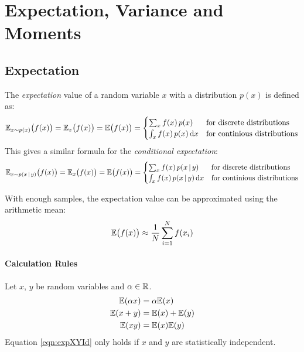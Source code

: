 	\section{Expectation, Variance and Moments}
		\subsection{Expectation}
			The \emph{expectation} value of a random variable \(x\) with a distribution \(p(x)\) is defined as:
			\begin{equation}
				\mathbb{E}_{x \sim p(x)}\big(f(x)\big) = \mathbb{E}_x\big(f(x)\big) = \mathbb{E}\big(f(x)\big) =
				\begin{cases}
					\sum_x f(x) \, p(x)        & \textrm{for discrete distributions}   \\
					\int_x f(x) \, p(x) \dd{x} & \textrm{for continious distributions}
				\end{cases}
			\end{equation}
			This gives a similar formula for the \emph{conditional expectation}:
			\begin{equation}
				\mathbb{E}_{x \sim p(x \,\vert\, y)}\big(f(x)\big) = \mathbb{E}_x\big(f(x)\big) = \mathbb{E}\big(f(x)\big) =
				\begin{cases}
					\sum_x f(x) \, p(x \,\vert\, y)        & \textrm{for discrete distributions}   \\
					\int_x f(x) \, p(x \,\vert\, y) \dd{x} & \textrm{for continious distributions}
				\end{cases}
			\end{equation}

			With enough samples, the expectation value can be approximated using the arithmetic mean:
			\begin{equation}
				\mathbb{E}\big(f(x)\big) \approx \frac{1}{N} \sum_{i = 1}^{N} f(x_i)
			\end{equation}

			\paragraph{Calculation Rules}
				Let \(x\), \(y\) be random variables and \(\alpha \in \mathbb{R}\).
				\begin{align}
					\mathbb{E}(\alpha x) & = \alpha \mathbb{E}(x)                    \\
					\mathbb{E}(x + y)    & = \mathbb{E}(x) + \mathbb{E}(y)                   \\
					\mathbb{E}(xy)       & = \mathbb{E}(x) \mathbb{E}(y) \label{eqn:expXYId}
				\end{align}
				Equation \ref{eqn:expXYId} only holds if \(x\) and \(y\) are statistically independent.

